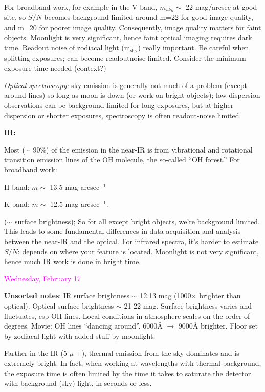 \documentclass[12pt]{article}
\begin{document}
For broadband work, for example in the V band, $m_{sky}\sim$ 22
mag/arcsec at good site,
so $S/N$ becomes background limited around m=22 for good image quality,
and m=20 for poorer image quality.
Consequently, image quality matters for faint objects.
Moonlight is very significant, hence faint optical imaging requires
dark time.
\textcolor{myBlue}
{Readout noise of zodiacal light (m$_{\textrm{sky}}$) really important.
Be careful when splitting exposures;
can become readoutnoise limited.
Consider the minimum exposure time needed (context?)}

\emph{Optical spectroscopy:} sky emission is generally not much of a problem
(except around lines) so long as moon is down (or work on bright objects);
low dispersion observations can be background-limited for long exposures,
but at higher dispersion or shorter exposures,
spectroscopy is often readout-noise limited.

\textbf{IR:}

Most ($\sim$ 90\%) of the emission in the near-IR is from
vibrational and rotational transition emission lines of the OH molecule,
the so-called ``OH forest.''
For broadband work:
\begin{itemize*}
    \item H band: $m\sim$ 13.5 mag arcsec$^{-1}$
    \item K band: $m\sim$ 12.5 mag arcsec$^{-1}$.
\end{itemize*}
($\sim$ surface brightness);
So for all except bright objects, we're background limited.
This leads to some
fundamental differences in data acquisition and analysis between the
near-IR and the optical. For infrared spectra, it's harder to estimate
$S/N$: depends on where your feature is located. Moonlight is not very
significant, hence much IR work is done in bright time.

\textcolor{magenta}{Wednesday, February 17}

\textcolor{myBlue}{\textbf{Unsorted notes}: IR surface brightness
    $\sim$ 12.13 mag (1000$\times$ brighter than optical).
    Optical surface brightness $\sim$ 21-22 mag.
    Surface brightness varies and fluctuates, esp OH lines.
    Local conditions in atmosphere scales on the order of degrees.
    Movie: OH lines ``dancing around''.
    6000\AA{} $\rightarrow$ 9000\AA{} brighter. Floor set by zodiacal
    light with added stuff by moonlight.
}

Farther in the IR (5 $\mu$ +), thermal emission from the sky dominates
and is extremely bright. In fact, when working at wavelengths with thermal
background, the exposure time is often limited by the time it takes to
saturate the detector with background (sky) light, in seconds or less.
\end{document}
